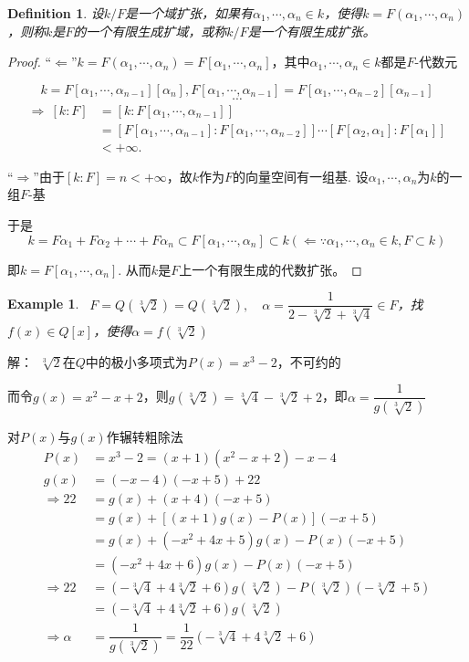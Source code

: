 \documentclass[UTF8]{article}
\newtheorem{defn}{Definition}[section]
\newtheorem{exa}{Example}[section]
\begin{document}
\begin{defn}
设$k/F$是一个域扩张，如果有$\alpha_1,\cdots,\alpha_n\in k$，使得$k=F\left( \alpha_1,\cdots,\alpha_n\right)$，则称$k$是$F$的一个有限生成扩域，或称$k/F$是一个有限生成扩张。
\end{defn}
\begin{proof}
“$\Longleftarrow$”\quad $k=F\left( \alpha_1,\cdots,\alpha_n\right)=F\left[ \alpha_1,\cdots,\alpha_n\right]$，其中$\alpha_1,\cdots,\alpha_n\in k$都是$F$-代数元

$$k=F\left[ \alpha_1,\cdots,\alpha_{n-1}\right]\left[ \alpha_n\right],F\left[ \alpha_1,\cdots,\alpha_{n-1}\right]=F\left[ \alpha_1,\cdots,\alpha_{n-2}\right]\left[ \alpha_{n-1}\right]$$
$$\cdots$$
\[
\begin{split}
\Rightarrow\ \left[ k: F\right]&=\left[ k: F\left[ \alpha_1,\cdots,\alpha_{n-1}\right]\right]\\
&=\left[ F\left[ \alpha_1,\cdots,\alpha_{n-1}\right]: F\left[ \alpha_1,\cdots,\alpha_{n-2}\right]\right]\cdots\left[ F\left[ \alpha_2,\alpha_1\right]: F\left[ \alpha_1\right]\right]\\
&<+\infty.
\end{split}
\]

“$\Longrightarrow$”\quad 由于$[k: F]=n<+\infty$，故$k$作为$F$的向量空间有一组基.
设$\alpha_1,\cdots,\alpha_n$为$k$的一组$F$-基

于是
$$k=F\alpha_1+F\alpha_2+\cdots+F\alpha_n\subset F\left[ \alpha_1,\cdots,\alpha_n\right]\subset k(\Leftarrow \because \alpha_1,\cdots,\alpha_n\in k, F\subset k)$$

即$k=F\left[ \alpha_1,\cdots,\alpha_n\right]$.
从而$k$是$F$上一个有限生成的代数扩张。	
\end{proof}


\begin{exa}
\ $F=Q\left( \sqrt[3]{2}\right)=Q\left( \sqrt[3]{2}\right),\quad \alpha=\dfrac{1}{2-\sqrt[3]{2}+\sqrt[3]{4}}\in F$，找$f(x)\in Q[x]$，使得$\alpha=f\left( \sqrt[3]{2}\right)$
\end{exa}
解：\quad\ $\sqrt[3]{2}$在$Q$中的极小多项式为$P(x)=x^3-2$，不可约的

\quad 而令$g(x)=x^2-x+2$，则$g\left( \sqrt[3]{2}\right)=\sqrt[3]{4}-\sqrt[3]{2}+2$，即$\alpha=\dfrac{1}{g\left( \sqrt[3]{2}\right)}$

\quad 对$P(x)$与$g(x)$作辗转粗除法
$$
\begin{aligned}
P(x)&=x^{3}-2=(x+1)\left(x^{2}-x+2\right)-x-4\\ 
g(x)&=(-x-4)(-x+5)+22\\ 
\Rightarrow 22&=g(x)+(x+4)(-x+5)\\ 
&=g(x)+[(x+1) g(x)-P(x)](-x+5)\\ 
&=g(x)+\left(-x^{2}+4 x+5\right) g(x)-P(x)(-x+5)\\
&=\left(-x^{2}+4 x+6\right) g(x)-P(x)(-x+5)\\ 
\Rightarrow 22&=\left(-\sqrt[3]{4}+4\sqrt[3]{2}+6\right) g(\sqrt[3]{2})-P(\sqrt[3]{2})(-\sqrt[3]{2}+5)\\ 
&=\left(-\sqrt[3]{4}+4\sqrt[3]{2}+6\right) g(\sqrt[3]{2})\\ 
\Rightarrow\alpha&=\dfrac{1}{g\left(\sqrt[3]{2}\right)}=\dfrac{1}{22}\left(-\sqrt[3]{4}+4\sqrt[3]{2}+6\right)
\end{aligned}
$$
\end{document}
